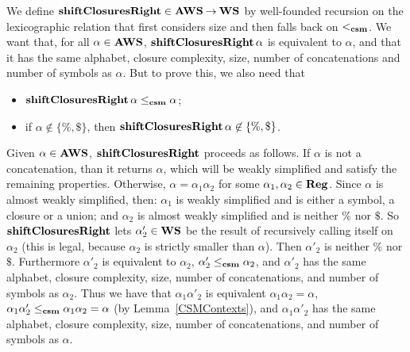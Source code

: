 We define $\mathbf{shiftClosuresRight}\in\mathbf{AWS}\mathbin{\to}\mathbf{WS}$ by well-founded
recursion on the lexicographic relation that first considers size and
then falls back on $\mathrel{<_{\mathbf{csm}}}$. We want that, for all $\alpha\in\mathbf{AWS}$,
$\mathbf{shiftClosuresRight}\,\alpha$ is equivalent
to $\alpha$, and that it has the same alphabet, closure complexity,
size, number of concatenations and number of symbols as $\alpha$.  But
to prove this, we also need that
\begin{itemize}
\item $\mathbf{shiftClosuresRight}\,\alpha\mathrel{\leq_{\mathbf{csm}}}\alpha$;

\item if $\alpha\notin\{\%,\$\}$, then $\mathbf{shiftClosuresRight}\,\alpha\not\in
\{\%,\$\}$.
\end{itemize}
Given $\alpha\in\mathbf{AWS}$, $\mathbf{shiftClosuresRight}$ proceeds as follows.  If
$\alpha$ is not a concatenation, than it returns $\alpha$, which will
be weakly simplified and satisfy the remaining properties.  Otherwise,
$\alpha = \alpha_1\alpha_2$ for some $\alpha_1,\alpha_2\in\mathbf{Reg}$.
Since $\alpha$ is almost weakly simplified, then: $\alpha_1$ is weakly
simplified and is either a symbol, a closure or a union; and
$\alpha_2$ is almost weakly simplified and is neither $\%$ nor $\$$.
So $\mathbf{shiftClosuresRight}$ lets
$\alpha'_2\in\mathbf{WS}$ be the result of recursively calling itself on
$\alpha_2$ (this is legal, because
$\alpha_2$ is strictly smaller than $\alpha$).  Then
$\alpha'_2$ is neither $\%$ nor $\$$. Furthermore $\alpha'_2$ is
equivalent to $\alpha_2$, $\alpha'_2\mathrel{\leq_{\mathbf{csm}}}\alpha_2$, and $\alpha'_2$
has the same alphabet, closure complexity, size, number of
concatenations, and number of symbols as $\alpha_2$.  Thus we have
that $\alpha_1\alpha'_2$ is equivalent $\alpha_1\alpha_2=\alpha$,
$\alpha_1\alpha'_2\mathrel{\leq_{\mathbf{csm}}}\alpha_1\alpha_2=\alpha$ (by
Lemma~\ref{CSMContexts}), and $\alpha_1\alpha'_2$ has the same
alphabet, closure complexity, size, number of concatenations, and
number of symbols as $\alpha$.
